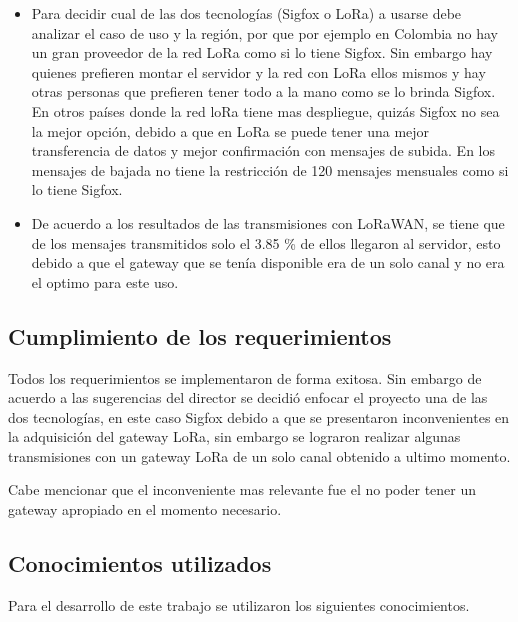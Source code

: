 \begin{itemize}
    \item Para decidir cual de las dos tecnologías (Sigfox o LoRa) a usarse debe analizar el caso de uso y la región, por que por ejemplo en Colombia  no hay un gran proveedor de la red LoRa como si lo tiene Sigfox. Sin embargo hay quienes prefieren montar el servidor y la red con LoRa ellos mismos y hay otras personas que prefieren tener todo a la mano como se lo brinda Sigfox. En otros países donde la red loRa tiene mas despliegue, quizás Sigfox no sea la mejor opción, debido a que en LoRa se puede tener una mejor transferencia de datos y mejor confirmación con mensajes de subida. En los mensajes de bajada no tiene la restricción de 120 mensajes mensuales como si lo tiene Sigfox.
    \item De acuerdo a los resultados de las transmisiones con LoRaWAN, se tiene que de los mensajes transmitidos solo el 3.85 \% de ellos llegaron al servidor, esto debido a que el gateway que se tenía disponible era de un solo canal y no era el optimo para este uso.
\end{itemize}


\subsection{Cumplimiento de los requerimientos}

Todos los requerimientos se implementaron de forma exitosa. Sin embargo de acuerdo a las sugerencias del director se decidió enfocar el proyecto una de las dos tecnologías, en este caso Sigfox debido a que se presentaron inconvenientes en la adquisición del gateway LoRa, sin embargo se lograron realizar algunas transmisiones con un gateway LoRa de un solo canal obtenido a ultimo momento.

Cabe mencionar que el inconveniente mas relevante fue el no poder tener un gateway apropiado en el momento necesario.

\subsection{Conocimientos utilizados}
Para el desarrollo de este trabajo se utilizaron los siguientes conocimientos.


